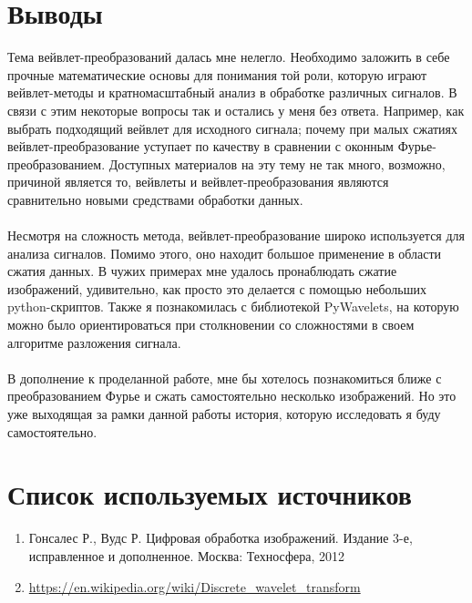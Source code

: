 \documentclass[12pt]{article}
\begin{document}
\lstset{style=mystyle}



\newpage

\section*{Выводы}

Тема вейвлет-преобразований далась мне нелегло. Необходимо заложить в себе прочные математические основы для
понимания той роли, которую играют вейвлет-методы и кратномасштабный анализ в обработке различных сигналов. В связи с этим некоторые вопросы так и остались у меня без ответа. Например, как выбрать подходящий вейвлет для исходного сигнала; почему при малых сжатиях вейвлет-преобразование уступает по качеству в сравнении с оконным Фурье-преобразованием. Доступных материалов на эту тему не так много, возможно, причиной является то, вейвлеты и вейвлет-преобразования являются сравнительно новыми средствами обработки данных.\\
\\
Несмотря на сложность метода, вейвлет-преобразование широко используется для анализа сигналов. Помимо этого, оно находит большое применение в области сжатия данных. В чужих примерах мне удалось пронаблюдать сжатие изображений, удивительно, как просто это делается с помощью небольших python-скриптов. Также я познакомилась с библиотекой PyWavelets, на которую можно было ориентироваться при столкновении со сложностями в своем алгоритме разложения сигнала.\\
\\
В дополнение к проделанной работе, мне бы хотелось познакомиться ближе с преобразованием Фурье и сжать самостоятельно несколько изображений. Но это уже выходящая за рамки данной работы история, которую исследовать я буду самостоятельно.
\section*{Список используемых источников}
\begin{enumerate}
\item Гонсалес Р., Вудс Р. Цифровая обработка изображений. Издание 3-е, исправленное и дополненное. Москва: Техносфера, 2012
\item \url{https://en.wikipedia.org/wiki/Discrete_wavelet_transform}
\end{enumerate}
\end{document}
